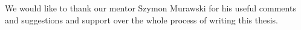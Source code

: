 \documentclass[
    11pt,
    english, %
    singlespacing, %
    headsepline, %
    oneside, %
]{MastersDoctoralThesis} %
\begin{document}

    \begin{acknowledgements}
        \addchaptertocentry{\acknowledgementname} %
        We would like to thank our mentor Szymon Murawski for his useful comments and suggestions and support
        over the whole process of writing this thesis.
    \end{acknowledgements}


    \tableofcontents %
%
%






%
%
%
\end{document}
